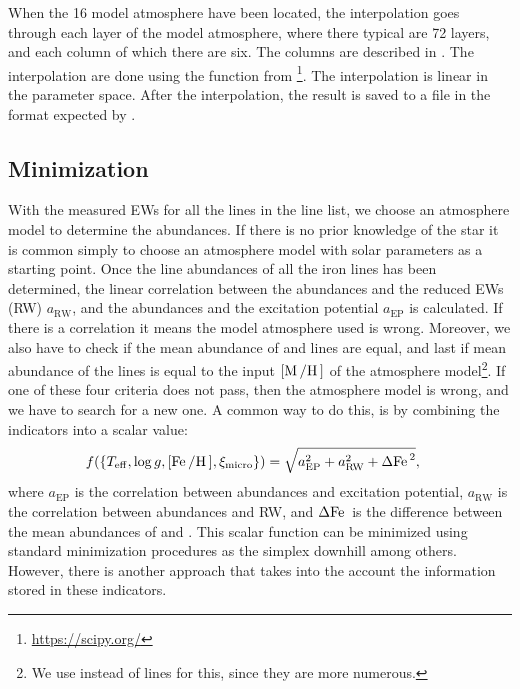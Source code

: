 When the 16 model atmosphere have been located, the interpolation goes through each layer of the
model atmosphere, where there typical are 72 layers, and each column of which there are six. The
columns are described in . The interpolation are done using the
 function from \footnote{\url{https://scipy.org/}}. The interpolation is
linear in the parameter space. After the interpolation, the result is saved to a file in the format
expected by .




\subsection{Minimization}
\label{sec:minimization}

With the measured EWs for all the lines in the line list, we choose an atmosphere model to determine
the abundances. If there is no prior knowledge of the star it is common simply to choose an
atmosphere model with solar parameters as a starting point. Once the line abundances of all the iron
lines has been determined, the linear correlation between the abundances and the reduced EWs (RW)
$a_\mathrm{RW}$, and the abundances and the excitation potential $a_\mathrm{EP}$ is calculated. If
there is a correlation it means the model atmosphere used is wrong. Moreover, we also have to check
if the mean abundance of  and  lines are equal, and last if mean abundance of
the  lines is equal to the input $[\ion{M}/\ion{H}]$ of the atmosphere model\footnote{We
use  instead of  lines for this, since they are more numerous.}. If one of
these four criteria does not pass, then the atmosphere model is wrong, and we have to search for a
new one. A common way to do this, is by combining the indicators into a scalar value:
\begin{align}
  f(\{T_\mathrm{eff}, \log g, [\ion{Fe}/\ion{H}], \xi_\mathrm{micro}\}) &= \sqrt{a_\mathrm{EP}^2 + a_\mathrm{RW}^2 + \Delta\ion{Fe}{}^2},
\end{align}
where $a_\mathrm{EP}$ is the correlation between abundances and excitation potential,
$a_\mathrm{RW}$ is the correlation between abundances and RW, and $\Delta\ion{Fe}{}$ is the
difference between the mean abundances of  and . This scalar function can be
minimized using standard minimization procedures as the simplex downhill among others. However,
there is another approach that takes into the account the information stored in these indicators.

